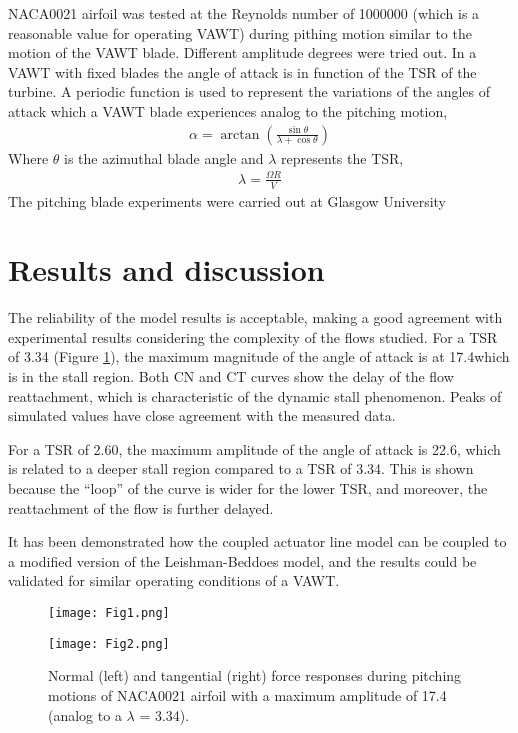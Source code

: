 \documentclass[a4paper]{jpconf}
\begin{document}
NACA0021 airfoil was tested at the Reynolds number of 1000000 (which is a
reasonable value for operating VAWT) during pithing motion similar to the motion
of the VAWT blade. Different amplitude degrees were tried out. In a VAWT with
fixed blades the angle of attack is in function of the TSR of the turbine. A
periodic function is used to represent the variations of the angles of attack
which a VAWT blade experiences analog to the pitching motion,
\begin{eqnarray}
    \alpha = \arctan \left( \frac{\sin \theta}{\lambda + \cos \theta} \right)
\end{eqnarray}
Where $\theta$ is the azimuthal blade angle and $ \lambda $ represents the TSR,
\begin{eqnarray}
    \lambda =  \frac{\Omega R}{V}
\end{eqnarray}
The pitching blade experiments were carried out at Glasgow
University\cite{angell1988collected}\\


\section{Results and discussion}

The reliability of the model results is acceptable, making a good agreement with
experimental results considering the complexity of the flows studied. For a TSR
of 3.34 (Figure \ref{fig1}), the maximum magnitude of the angle of attack is at
17.4\degree which is in the stall region. Both CN and CT curves show the delay
of the flow reattachment, which is characteristic of the dynamic stall
phenomenon. Peaks of simulated values have close agreement with the measured
data.

For a TSR of 2.60, the maximum amplitude of the angle of attack is 22.6, which
is related to a deeper stall region compared to a TSR of 3.34. This is shown
because the ``loop'' of the curve is wider for the lower TSR, and moreover, the
reattachment of the flow is further delayed.

It has been demonstrated how the coupled actuator line model can be coupled to
a modified version of the Leishman-Beddoes model, and the results could be
validated for similar operating conditions of a VAWT.


\begin{figure}[h]
\begin{minipage}{18pc}
\texttt{[image: Fig1.png]}
\end{minipage}\hspace{2pc}%
\begin{minipage}{18pc}
\texttt{[image: Fig2.png]}
\end{minipage}
\caption{\label{fig1}Normal (left) and tangential (right) force responses during pitching motions of NACA0021 airfoil with a maximum amplitude of 17.4 \degree (analog to a $\lambda$ = 3.34).}
\end{figure}
\end{document}
